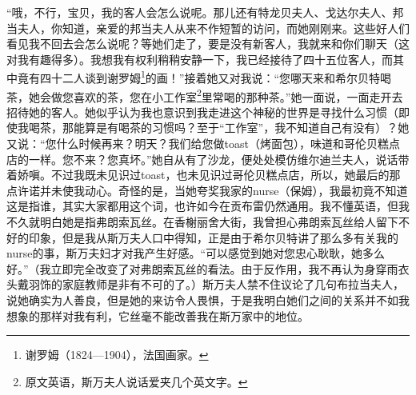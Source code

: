 \par “哦，不行，宝贝，我的客人会怎么说呢。那儿还有特龙贝夫人、戈达尔夫人、邦当夫人，你知道，亲爱的邦当夫人从来不作短暂的访问，而她刚刚来。这些好人们看见我不回去会怎么说呢？等她们走了，要是没有新客人，我就来和你们聊天（这对我有趣得多）。我想我有权利稍稍安静一下，我已经接待了四十五位客人，而其中竟有四十二人谈到谢罗姆\footnote{谢罗姆（1824—1904），法国画家。}的画！”接着她又对我说：“您哪天来和希尔贝特喝茶，她会做您喜欢的茶，您在小工作室\footnote{原文英语，斯万夫人说话爱夹几个英文字。}里常喝的那种茶。”她一面说，一面走开去招待她的客人。她似乎认为我也意识到我走进这个神秘的世界是寻找什么习惯（即使我喝茶，那能算是有喝茶的习惯吗？至于“工作室”，我不知道自己有没有）？她又说：“您什么时候再来？明天？我们给您做toast（烤面包），味道和哥伦贝糕点店的一样。您不来？您真坏。”她自从有了沙龙，便处处模仿维尔迪兰夫人，说话带着娇嗔。不过我既未见识过toast，也未见识过哥伦贝糕点店，所以，她最后的那点许诺并未使我动心。奇怪的是，当她夸奖我家的nurse（保姆），我最初竟不知道这是指谁，其实大家都用这个词，也许如今在贡布雷仍然通用。我不懂英语，但我不久就明白她是指弗朗索瓦丝。在香榭丽舍大街，我曾担心弗朗索瓦丝给人留下不好的印象，但是我从斯万夫人口中得知，正是由于希尔贝特讲了那么多有关我的nurse的事，斯万夫妇才对我产生好感。“可以感觉到她对您忠心耿耿，她多么好。”（我立即完全改变了对弗朗索瓦丝的看法。由于反作用，我不再认为身穿雨衣头戴羽饰的家庭教师是非有不可的了。）斯万夫人禁不住议论了几句布拉当夫人，说她确实为人善良，但是她的来访令人畏惧，于是我明白她们之间的关系并不如我想象的那样对我有利，它丝毫不能改善我在斯万家中的地位。
